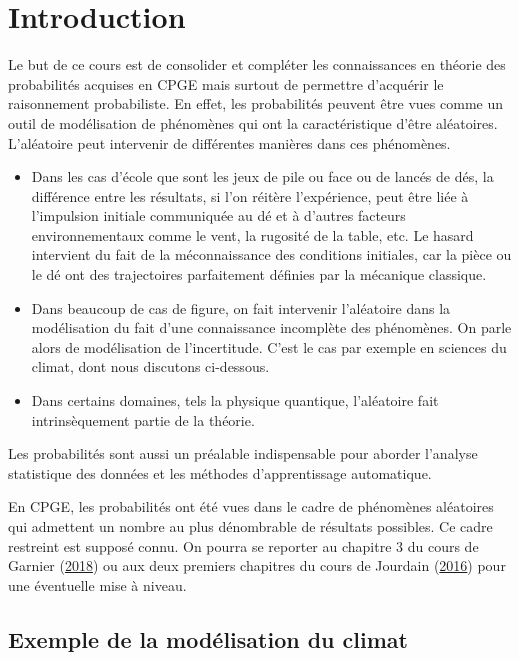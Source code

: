 \chapter{Introduction}\label{I-introduction}

Le but de ce cours est de consolider et compléter les connaissances en
théorie des probabilités acquises en CPGE mais surtout de permettre
d'acquérir le raisonnement probabiliste. En effet, les probabilités
peuvent être vues comme un outil de modélisation de phénomènes qui ont
la caractéristique d'être aléatoires. L'aléatoire peut intervenir de
différentes manières dans ces phénomènes.

\begin{itemize}
\tightlist
\item
  Dans les cas d'école que sont les jeux de pile ou face ou de lancés de
  dés, la différence entre les résultats, si l'on réitère l'expérience,
  peut être liée à l'impulsion initiale communiquée au dé et à d'autres
  facteurs environnementaux comme le vent, la rugosité de la table, etc.
  Le hasard intervient du fait de la méconnaissance des conditions
  initiales, car la pièce ou le dé ont des trajectoires parfaitement
  définies par la mécanique classique.
\item
  Dans beaucoup de cas de figure, on fait intervenir l'aléatoire dans la
  modélisation du fait d'une connaissance incomplète des phénomènes. On
  parle alors de modélisation de l'incertitude. C'est le cas par exemple
  en sciences du climat, dont nous discutons ci-dessous.
\item
  Dans certains domaines, tels la physique quantique, l'aléatoire fait
  intrinsèquement partie de la théorie.
\end{itemize}

Les probabilités sont aussi un préalable indispensable pour aborder
l'analyse statistique des données et les méthodes d'apprentissage
automatique.

En CPGE, les probabilités ont été vues dans le cadre de phénomènes
aléatoires qui admettent un nombre au plus dénombrable de résultats
possibles. Ce cadre restreint est supposé connu. On pourra se reporter
au chapitre 3 du cours de Garnier
(\protect\hyperlink{refI-polygarnier}{2018}) ou aux deux premiers
chapitres du cours de Jourdain (\protect\hyperlink{refI-polyponts}{2016})
pour une éventuelle mise à niveau.

\section{Exemple de la modélisation du
climat}\label{I-exemple-de-la-moduxe9lisation-du-climat}

